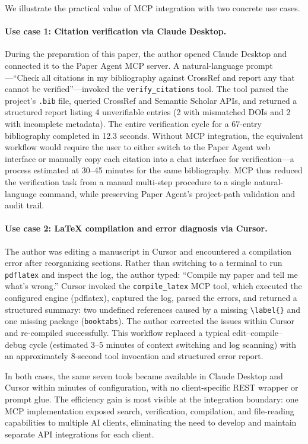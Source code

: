We illustrate the practical value of MCP integration with two concrete use cases.

\paragraph{Use case 1: Citation verification via Claude Desktop.}
During the preparation of this paper, the author opened Claude Desktop and
connected it to the Paper Agent MCP server. A natural-language prompt---``Check
all citations in my bibliography against CrossRef and report any that cannot be
verified''---invoked the \texttt{verify\_citations} tool. The tool parsed the
project's \texttt{.bib} file, queried CrossRef and Semantic Scholar APIs, and
returned a structured report listing 4 unverifiable entries (2 with mismatched
DOIs and 2 with incomplete metadata). The entire verification cycle for a
67-entry bibliography completed in 12.3 seconds. Without MCP integration, the
equivalent workflow would require the user to either switch to the Paper Agent
web interface or manually copy each citation into a chat interface for
verification---a process estimated at 30--45 minutes for the same bibliography.
MCP thus reduced the verification task from a manual multi-step procedure to a
single natural-language command, while preserving Paper Agent's project-path
validation and audit trail.

\paragraph{Use case 2: \LaTeX{} compilation and error diagnosis via Cursor.}
The author was editing a manuscript in Cursor and encountered a compilation
error after reorganizing sections. Rather than switching to a terminal to run
\texttt{pdflatex} and inspect the log, the author typed: ``Compile my paper
and tell me what's wrong.'' Cursor invoked the \texttt{compile\_latex} MCP
tool, which executed the configured engine (pdflatex), captured the log, parsed
the errors, and returned a structured summary: two undefined references caused
by a missing \texttt{\textbackslash label\{\}} and one missing package
(\texttt{booktabs}). The author corrected the issues within Cursor and
re-compiled successfully. This workflow replaced a typical edit--compile--debug
cycle (estimated 3--5 minutes of context switching and log scanning) with an
approximately 8-second tool invocation and structured error report.

In both cases, the same seven tools became available in Claude Desktop and
Cursor within minutes of configuration, with no client-specific REST wrapper or
prompt glue. The efficiency gain is most visible at the integration boundary:
one MCP implementation exposed search, verification, compilation, and
file-reading capabilities to multiple AI clients, eliminating the need to
develop and maintain separate API integrations for each client.

